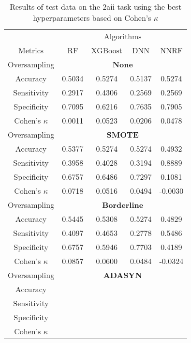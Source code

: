 \begin{table}[!htb]
\centering
\caption{Results of test data on the 2aii task using the best hyperparameters based on Cohen's $\kappa$}
\label{tab:2aii_test_results}
\begin{tabular}{c | c c c c}
\hline
 & \multicolumn{4}{c}{Algorithms}\\ 
Metrics &RF & XGBoost & DNN & NNRF\\ 
\hline
Oversampling &\multicolumn{4}{|c}{\textbf{None}}\\ 
\hline
Accuracy & 0.5034 & 0.5274 & 0.5137 & 0.5274\\ 
Sensitivity & 0.2917 & 0.4306 & 0.2569 & 0.2569\\ 
Specificity & 0.7095 & 0.6216 & 0.7635 & 0.7905\\ 
Cohen's $\kappa$ & 0.0011 & 0.0523 & 0.0206 & 0.0478\\ 
\hline
Oversampling &\multicolumn{4}{|c}{\textbf{SMOTE}}\\ 
\hline
Accuracy & 0.5377 & 0.5274 & 0.5274 & 0.4932\\ 
Sensitivity & 0.3958 & 0.4028 & 0.3194 & 0.8889\\ 
Specificity & 0.6757 & 0.6486 & 0.7297 & 0.1081\\ 
Cohen's $\kappa$ & 0.0718 & 0.0516 & 0.0494 & -0.0030\\ 
\hline
Oversampling &\multicolumn{4}{|c}{\textbf{Borderline}}\\ 
\hline
Accuracy & 0.5445 & 0.5308 & 0.5274 & 0.4829\\ 
Sensitivity & 0.4097 & 0.4653 & 0.2778 & 0.5486\\ 
Specificity & 0.6757 & 0.5946 & 0.7703 & 0.4189\\ 
Cohen's $\kappa$ & 0.0857 & 0.0600 & 0.0484 & -0.0324\\ 
\hline
Oversampling &\multicolumn{4}{|c}{\textbf{ADASYN}}\\ 
\hline
Accuracy &  &  &  & \\ 
Sensitivity &  &  &  & \\ 
Specificity &  &  &  & \\ 
Cohen's $\kappa$ &  &  &  & \\ 
\hline
\end{tabular}
\end{table}


